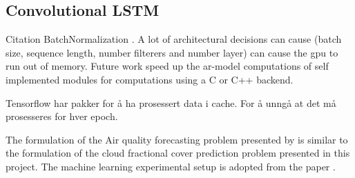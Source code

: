 \begin{table}[h]
    \centering
    \caption{Configuration of \acrshort{ar}-models. $\times$ denoted not applied, \checked denotes applied \textbf{add bias??} Gi modellen navn basert på configurasjonen $AR_{STEx}$ where x is the order.}
    \label{tab:ar_model_config}
\end{table}




\subsection{Convolutional LSTM}
Citation BatchNormalization \cite{ioffe2015batch}. 
A lot of architectural decisions can cause (batch size, sequence length, number filterers and number layer) can cause the \acrshort{gpu} to run out of memory. Future work speed up the \acrshort{ar}-model computations of self implemented modules for computations using  a C or C++ backend.

Tensorflow har pakker for å ha prosessert data i cache. For å unngå at det må prosesseres for hver epoch. 



The formulation of the Air quality forecasting problem presented by  \citeauthor{SunAirLSTM} is similar to the formulation of the cloud fractional cover prediction problem presented in this project. The machine learning experimental setup is adopted from the paper . 


